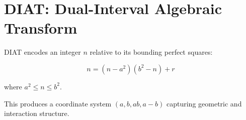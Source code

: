 \section*{DIAT: Dual-Interval Algebraic Transform}

DIAT encodes an integer $n$ relative to its bounding perfect squares:

\[ n = (n - a^2)(b^2 - n) + r \]

where $a^2 \le n \le b^2$.

This produces a coordinate system $(a, b, ab, a-b)$ capturing geometric and interaction structure.
